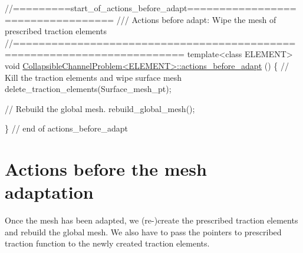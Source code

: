  
\begin{DoxyCodeInclude}
\textcolor{comment}{//=========start\_of\_actions\_before\_adapt==================================}
\textcolor{comment}{/// Actions before adapt: Wipe the mesh of prescribed traction elements}
\textcolor{comment}{}\textcolor{comment}{//========================================================================}
\textcolor{keyword}{template}<\textcolor{keyword}{class} ELEMENT>
\textcolor{keywordtype}{void} \hyperlink{classCollapsibleChannelProblem_a54abc5259d590154e5dfa458d885c16c}{CollapsibleChannelProblem<ELEMENT>::actions\_before\_adapt}
      ()
\{
 \textcolor{comment}{// Kill the traction elements and wipe surface mesh}
 delete\_traction\_elements(Surface\_mesh\_pt);
 
 \textcolor{comment}{// Rebuild the global mesh. }
 rebuild\_global\_mesh();

\} \textcolor{comment}{// end of actions\_before\_adapt}

\end{DoxyCodeInclude}




 

\hypertarget{index_beforeadapt}{}\section{Actions before the mesh adaptation}\label{index_beforeadapt}
Once the mesh has been adapted, we (re-\/)create the prescribed traction elements and rebuild the global mesh. We also have to pass the pointers to prescribed traction function to the newly created traction elements.


